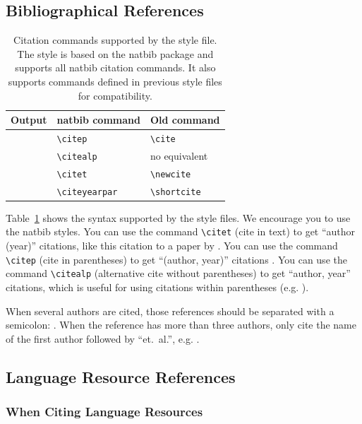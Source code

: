 \documentclass[10pt, a4paper]{article}
\begin{document}
\subsection{Bibliographical References}


\begin{table}
\centering
\begin{tabular}{lll}
\hline
\textbf{Output} & \textbf{natbib command} & \textbf{Old command}\\
\hline
\citep{Eco:1990} & \verb|\citep| & \verb|\cite| \\
\citealp{Eco:1990} & \verb|\citealp| & no equivalent \\
\citet{Eco:1990} & \verb|\citet| & \verb|\newcite| \\
\citeyearpar{Eco:1990} & \verb|\citeyearpar| & \verb|\shortcite| \\
\hline
\end{tabular}
\caption{\label{citation-guide} Citation commands supported by the style file. The style is based on the natbib package and supports all natbib citation commands. It also supports commands defined in previous style files for compatibility.}
\end{table}

Table~\ref{citation-guide} shows the syntax supported by the style files. We encourage you to use the natbib styles.
You can use the command \verb|\citet| (cite in text) to get ``author (year)'' citations, like this citation to a paper by \citet{CastorPollux-92}. You can use the command \verb|\citep| (cite in parentheses) to get ``(author, year)'' citations \citep{CastorPollux-92}. You can use the command \verb|\citealp| (alternative cite without parentheses) to get ``author, year'' citations, which is useful for using citations within parentheses (e.g. \citealp{CastorPollux-92}).

When several authors are cited, those references should be separated with a semicolon: \cite{Martin-90,CastorPollux-92}. When the reference has more than three authors, only cite the name of the first author followed by ``et.\ al.'', e.g. \citet{Superman-Batman-Catwoman-Spiderman-00}.

\subsection{Language Resource References}

\subsubsection{When Citing Language Resources}
\end{document}

